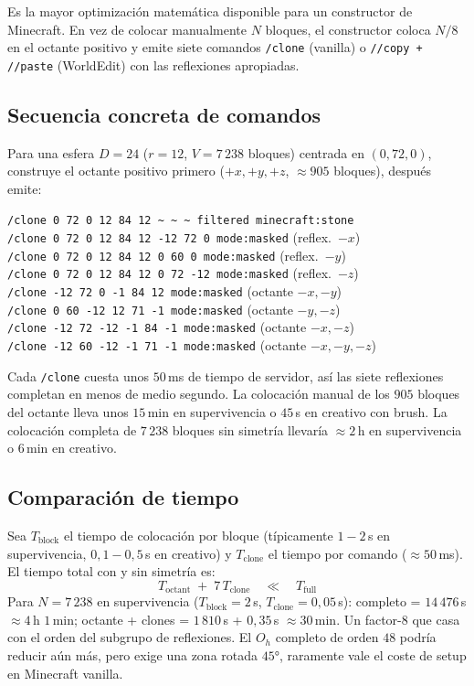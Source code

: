 \documentclass[12pt,a4paper]{scrartcl}
\newcommand{\cmd}[1]{\textcolor{earth}{\texttt{\small #1}}}
\begin{document}
Es la mayor optimización matemática disponible para un constructor de Minecraft. En vez de colocar manualmente $N$ bloques, el constructor coloca $N/8$ en el octante positivo y emite siete comandos \cmd{/clone} (vanilla) o \cmd{//copy + //paste} (WorldEdit) con las reflexiones apropiadas.

\subsection{Secuencia concreta de comandos}
Para una esfera $D=24$ ($r=12$, $V = 7\,238$ bloques) centrada en $(0,72,0)$, construye el octante positivo primero ($+x, +y, +z$, $\approx 905$ bloques), después emite:

\begin{minec}
\cmd{/clone 0 72 0 12 84 12 \textasciitilde\,\textasciitilde\,\textasciitilde\ filtered minecraft:stone}\\
\cmd{/clone 0 72 0 12 84 12 -12 72 0 mode:masked} \quad (reflex.\ \(-x\))\\
\cmd{/clone 0 72 0 12 84 12 0 60 0 mode:masked} \quad\quad (reflex.\ \(-y\))\\
\cmd{/clone 0 72 0 12 84 12 0 72 -12 mode:masked} \quad (reflex.\ \(-z\))\\
\cmd{/clone -12 72 0 -1 84 12 mode:masked} \quad\quad\quad\;\; (octante \(-x,-y\))\\
\cmd{/clone 0 60 -12 12 71 -1 mode:masked} \quad\quad\quad (octante \(-y,-z\))\\
\cmd{/clone -12 72 -12 -1 84 -1 mode:masked} \quad\;\; (octante \(-x,-z\))\\
\cmd{/clone -12 60 -12 -1 71 -1 mode:masked} \quad\;\; (octante \(-x,-y,-z\))
\end{minec}

Cada \cmd{/clone} cuesta unos $50$\,ms de tiempo de servidor, así las siete reflexiones completan en menos de medio segundo. La colocación manual de los $905$ bloques del octante lleva unos $15$\,min en supervivencia o $45$\,s en creativo con brush. La colocación completa de $7\,238$ bloques sin simetría llevaría $\approx 2$\,h en supervivencia o $6$\,min en creativo.

\subsection{Comparación de tiempo}
Sea $T_{\mathrm{block}}$ el tiempo de colocación por bloque (típicamente $1{-}2$\,s en supervivencia, $0{,}1{-}0{,}5$\,s en creativo) y $T_{\mathrm{clone}}$ el tiempo por comando ($\approx 50$\,ms). El tiempo total con y sin simetría es:
\[
T_{\mathrm{octant}} \;+\; 7\,T_{\mathrm{clone}}
\quad\ll\quad
T_{\mathrm{full}}
\]
Para $N = 7\,238$ en supervivencia ($T_{\mathrm{block}} = 2$\,s, $T_{\mathrm{clone}} = 0{,}05$\,s): completo = $14\,476$\,s $\approx 4$\,h $1$\,min; octante + clones = $1\,810$\,s + $0{,}35$\,s $\approx 30$\,min. Un factor-$8$ que casa con el orden del subgrupo de reflexiones. El $O_h$ completo de orden $48$ podría reducir aún más, pero exige una zona rotada $45°$, raramente vale el coste de setup en Minecraft vanilla.
\end{document}
